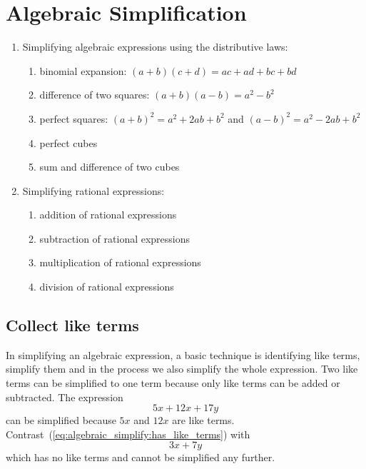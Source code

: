 
\chapter{Algebraic Simplification}

\begin{enumerate}
\item Simplifying algebraic expressions using the distributive laws:
  \begin{enumerate}
  \item binomial expansion: $(a + b)(c + d) = ac + ad + bc + bd$

  \item difference of two squares: $(a + b)(a - b) = a^2 - b^2$

  \item perfect squares: $(a + b)^2 = a^2 + 2ab + b^2$ and
    $(a - b)^2 = a^2 - 2ab + b^2$

  \item perfect cubes

  \item sum and difference of two cubes
  \end{enumerate}

\item Simplifying rational expressions:
  \begin{enumerate}
  \item addition of rational expressions

  \item subtraction of rational expressions

  \item multiplication of rational expressions

  \item division of rational expressions
  \end{enumerate}
\end{enumerate}



\section{Collect like terms}

In simplifying an algebraic expression, a basic technique is
identifying like terms, simplify them and in the
process we also simplify the whole expression. Two like terms can be
simplified to one term because only like terms can be added or
subtracted. The expression
%
\begin{equation}
\label{eq:algebraic_simplify:has_like_terms}
5x + 12x + 17y
\end{equation}
%
can be simplified because $5x$ and $12x$ are like
terms. Contrast~(\ref{eq:algebraic_simplify:has_like_terms}) with
\[
3x + 7y
\]
which has no like terms and cannot be simplified any further.

